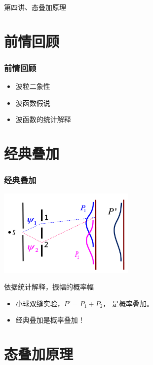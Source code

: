 
\begin{frame}
    \frametitle{}
    \begin{center}
    { {\huge 第四讲、态叠加原理}}
    \end{center}    
\end{frame}


\section{前情回顾}

\begin{frame}
    \frametitle{前情回顾}
    \begin{itemize}
        \item 波粒二象性
        \item 波函数假说
        \item 波函数的统计解释
    \end{itemize}
\end{frame}  

\section{经典叠加}

\begin{frame}
    \frametitle{经典叠加}
    \begin{center}
        \includegraphics[width=0.5\textwidth]{figs/sup-2.png} \\
    \end{center} 
    依据统计解释，振幅的概率幅\\
    \begin{itemize}
        \item 小球双缝实验，$P'=P_1+P_2 $， 是概率叠加。
        \item 经典叠加是概率叠加！
    \end{itemize}
\end{frame} 

\section{态叠加原理}

